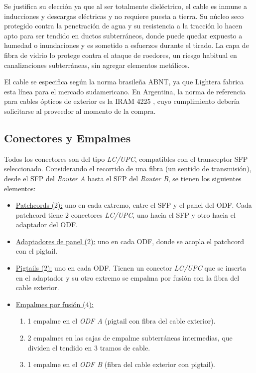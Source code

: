 Se justifica su elección ya que al ser totalmente dieléctrico, el cable es inmune a inducciones y descargas eléctricas y no requiere puesta a tierra. Su núcleo seco protegido contra la penetración de agua y su resistencia a la tracción lo hacen apto para ser tendido en ductos subterráneos, donde puede quedar expuesto a humedad o inundaciones y es sometido a esfuerzos durante el tirado. La capa de fibra de vidrio lo protege contra el ataque de roedores, un riesgo habitual en canalizaciones subterráneas, sin agregar elementos metálicos.

El cable se especifica según la norma brasileña ABNT, ya que Lightera fabrica esta línea para el mercado sudamericano. En Argentina, la norma de referencia para cables ópticos de exterior es la IRAM 4225 \cite{b16}, cuyo cumplimiento debería solicitarse al proveedor al momento de la compra.

\subsection{Conectores y Empalmes}
\label{sec_2.3}
Todos los conectores son del tipo \textit{LC/UPC}, compatibles con el transceptor SFP seleccionado. Considerando el recorrido de una fibra (un sentido de transmisión), desde el SFP del \textit{Router A} hasta el SFP del \textit{Router B}, se tienen los siguientes elementos:
\begin{itemize}
    \item \underline{Patchcords ($2$):} uno en cada extremo, entre el SFP y el panel del ODF. Cada patchcord tiene $2$ conectores \textit{LC/UPC}, uno hacia el SFP y otro hacia el adaptador del ODF.
    \item \underline{Adaptadores de panel ($2$):} uno en cada ODF, donde se acopla el patchcord con el pigtail.
    \item \underline{Pigtails ($2$):} uno en cada ODF. Tienen un conector \textit{LC/UPC} que se inserta en el adaptador y su otro extremo se empalma por fusión con la fibra del cable exterior.
    \item \underline{Empalmes por fusión ($4$):}
    \begin{enumerate}
        \item 1 empalme en el \textit{ODF A} (pigtail con fibra del cable exterior).
        \item 2 empalmes en las cajas de empalme subterráneas intermedias, que dividen el tendido en 3 tramos de cable.
        \item 1 empalme en el \textit{ODF B} (fibra del cable exterior con pigtail).
    \end{enumerate}
\end{itemize}


